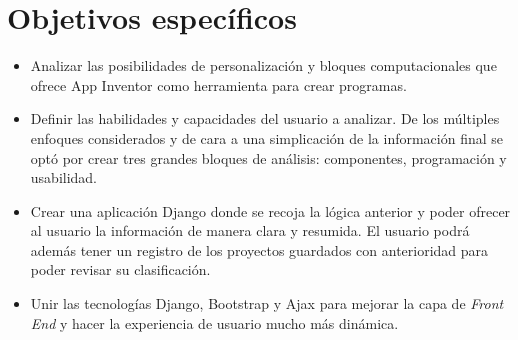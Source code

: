 \documentclass[a4paper, 12pt]{book}
\begin{document}
\section{Objetivos específicos}
\label{sec:objetivos-especificos}
\begin{itemize}
  \item Analizar las posibilidades de personalización y bloques computacionales que ofrece App Inventor como herramienta para crear programas.

  \item Definir las habilidades y capacidades del usuario a analizar. De los múltiples enfoques considerados y de cara a una simplicación de la información final se optó por crear tres grandes bloques de análisis: componentes, programación y usabilidad.

  \item Crear una aplicación Django donde se recoja la lógica anterior y poder ofrecer al usuario la información de manera clara y resumida. El usuario podrá además tener un registro de los proyectos guardados con anterioridad para poder revisar su clasificación. 
  
  \item Unir las tecnologías Django, Bootstrap y Ajax para mejorar la capa de \textit{Front End} y hacer la experiencia de usuario mucho más dinámica.   
\end{itemize}
\end{document}
